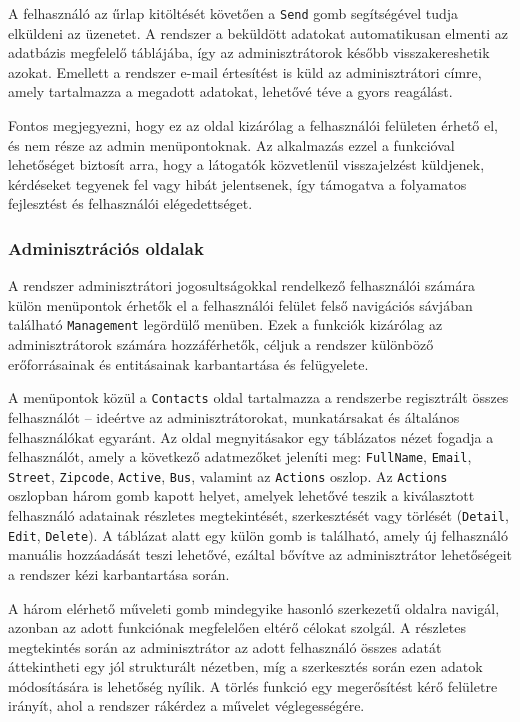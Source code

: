 A felhasználó az űrlap kitöltését követően a \texttt{Send} gomb segítségével tudja elküldeni az üzenetet. A rendszer a beküldött adatokat automatikusan elmenti az adatbázis megfelelő táblájába, így az adminisztrátorok később visszakereshetik azokat. Emellett a rendszer e-mail értesítést is küld az adminisztrátori címre, amely tartalmazza a megadott adatokat, lehetővé téve a gyors reagálást.

Fontos megjegyezni, hogy ez az oldal kizárólag a felhasználói felületen érhető el, és nem része az admin menüpontoknak. Az alkalmazás ezzel a funkcióval lehetőséget biztosít arra, hogy a látogatók közvetlenül visszajelzést küldjenek, kérdéseket tegyenek fel vagy hibát jelentsenek, így támogatva a folyamatos fejlesztést és felhasználói elégedettséget.

\subsubsection{Adminisztrációs oldalak}

A rendszer adminisztrátori jogosultságokkal rendelkező felhasználói számára külön menüpontok érhetők el a felhasználói felület felső navigációs sávjában található \texttt{Management} legördülő menüben. Ezek a funkciók kizárólag az adminisztrátorok számára hozzáférhetők, céljuk a rendszer különböző erőforrásainak és entitásainak karbantartása és felügyelete.

A menüpontok közül a \texttt{Contacts} oldal tartalmazza a rendszerbe regisztrált összes felhasználót – ideértve az adminisztrátorokat, munkatársakat és általános felhasználókat egyaránt. Az oldal megnyitásakor egy táblázatos nézet fogadja a felhasználót, amely a következő adatmezőket jeleníti meg: \texttt{FullName}, \texttt{Email}, \texttt{Street}, \texttt{Zipcode}, \texttt{Active}, \texttt{Bus}, valamint az \texttt{Actions} oszlop. Az \texttt{Actions} oszlopban három gomb kapott helyet, amelyek lehetővé teszik a kiválasztott felhasználó adatainak részletes megtekintését, szerkesztését vagy törlését (\texttt{Detail}, \texttt{Edit}, \texttt{Delete}). A táblázat alatt egy külön gomb is található, amely új felhasználó manuális hozzáadását teszi lehetővé, ezáltal bővítve az adminisztrátor lehetőségeit a rendszer kézi karbantartása során.

A három elérhető műveleti gomb mindegyike hasonló szerkezetű oldalra navigál, azonban az adott funkciónak megfelelően eltérő célokat szolgál. A részletes megtekintés során az adminisztrátor az adott felhasználó összes adatát áttekintheti egy jól strukturált nézetben, míg a szerkesztés során ezen adatok módosítására is lehetőség nyílik. A törlés funkció egy megerősítést kérő felületre irányít, ahol a rendszer rákérdez a művelet véglegességére.

